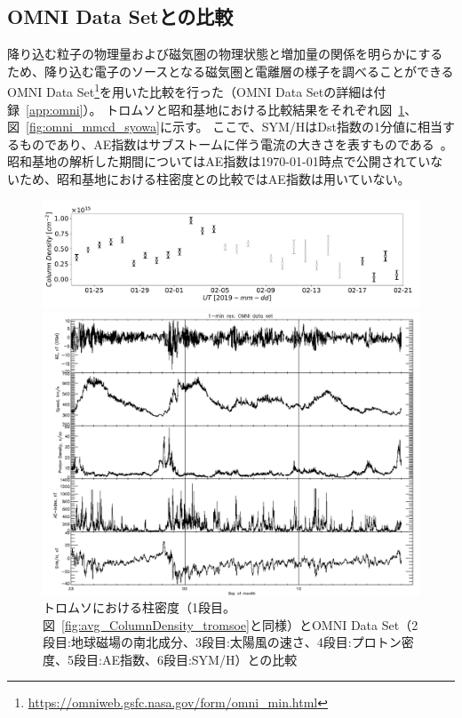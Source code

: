 \subsection{OMNI Data Setとの比較}
\label{ssec:comparison_omni}
降り込む粒子の物理量および磁気圏の物理状態と増加量の関係を明らかにするため、降り込む電子のソースとなる磁気圏と電離層の様子を調べることができるOMNI Data Set\footnote{\url{https://omniweb.gsfc.nasa.gov/form/omni_min.html}}を用いた比較を行った（OMNI Data Setの詳細は付録~\ref{app:omni}）。
トロムソと昭和基地における比較結果をそれぞれ図~\ref{fig:omni_mmcd_tromsoe}、図~\ref{fig:omni_mmcd_syowa}に示す。
ここで、SYM/HはDst指数の1分値に相当するものであり、AE指数はサブストームに伴う電流の大きさを表すものである~\cite{wdc2009asysym,wdc2022onAEindex}。
昭和基地の解析した期間についてはAE指数は\today 時点で公開されていないため、昭和基地における柱密度との比較ではAE指数は用いていない。\par
\begin{figure}[htbp]
    \centering
    \begin{minipage}{\linewidth}
        \centering
        \includegraphics[width=\linewidth]{master_thesis_contents/master_thesis_fig/avg_ColumnDensity_tromsoe.pdf}
    \end{minipage}
    \begin{minipage}{\linewidth}
        \centering
        \includegraphics[width=\linewidth]{master_thesis_contents/master_thesis_fig/omni_tromsoe.pdf}
    \end{minipage}
    \caption{トロムソにおける柱密度（1段目。図~\ref{fig:avg_ColumnDensity_tromsoe}と同様）とOMNI Data Set（2段目:地球磁場の南北成分、3段目:太陽風の速さ、4段目:プロトン密度、5段目:AE指数、6段目:SYM/H）との比較}
    \label{fig:omni_mmcd_tromsoe}
\end{figure}

